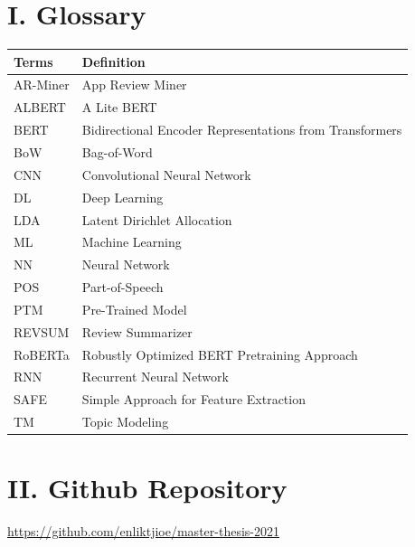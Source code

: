\documentclass[12pt]{article}
\begin{document}
\section*{I. Glossary}
\begin{table}[h]
\centering
\begin{tabular}{|l|l|}
\hline
\textbf{Terms} & \textbf{Definition}                                      \\
\hline
AR-Miner       & App Review Miner                                         \\
ALBERT         & A Lite BERT                                              \\
BERT           & Bidirectional Encoder Representations from Transformers  \\
BoW            & Bag-of-Word                                              \\
CNN            & Convolutional Neural Network                             \\
DL             & Deep Learning                                            \\
LDA            & Latent Dirichlet Allocation                              \\
ML             & Machine Learning                                         \\
NN             & Neural Network                                           \\
POS            & Part-of-Speech                                           \\
PTM            & Pre-Trained Model                                        \\
REVSUM         & Review Summarizer                                        \\
RoBERTa        & Robustly Optimized BERT Pretraining Approach             \\
RNN            & Recurrent Neural Network                                 \\
SAFE           & Simple Approach for Feature Extraction                   \\
TM             & Topic Modeling         \\
\hline            
\end{tabular}
\end{table}


\section*{II. Github Repository}
\url{https://github.com/enliktjioe/master-thesis-2021}
\end{document}
